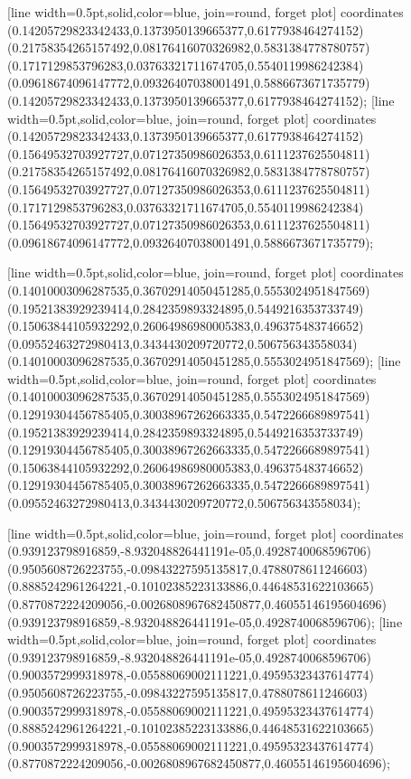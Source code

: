 [line width=0.5pt,solid,color=blue, join=round, forget plot] coordinates {(0.14205729823342433,0.1373950139665377,0.6177938464274152) (0.21758354265157492,0.08176416070326982,0.5831384778780757) (0.1717129853796283,0.03763321711674705,0.5540119986242384) (0.09618674096147772,0.09326407038001491,0.5886673671735779) (0.14205729823342433,0.1373950139665377,0.6177938464274152)};
[line width=0.5pt,solid,color=blue, join=round, forget plot] coordinates {(0.14205729823342433,0.1373950139665377,0.6177938464274152) (0.15649532703927727,0.07127350986026353,0.6111237625504811) (0.21758354265157492,0.08176416070326982,0.5831384778780757) (0.15649532703927727,0.07127350986026353,0.6111237625504811) (0.1717129853796283,0.03763321711674705,0.5540119986242384) (0.15649532703927727,0.07127350986026353,0.6111237625504811) (0.09618674096147772,0.09326407038001491,0.5886673671735779)};

[line width=0.5pt,solid,color=blue, join=round, forget plot] coordinates {(0.14010003096287535,0.36702914050451285,0.5553024951847569) (0.19521383929239414,0.2842359893324895,0.5449216353733749) (0.15063844105932292,0.26064986980005383,0.496375483746652) (0.09552463272980413,0.3434430209720772,0.506756343558034) (0.14010003096287535,0.36702914050451285,0.5553024951847569)};
[line width=0.5pt,solid,color=blue, join=round, forget plot] coordinates {(0.14010003096287535,0.36702914050451285,0.5553024951847569) (0.12919304456785405,0.30038967262663335,0.5472266689897541) (0.19521383929239414,0.2842359893324895,0.5449216353733749) (0.12919304456785405,0.30038967262663335,0.5472266689897541) (0.15063844105932292,0.26064986980005383,0.496375483746652) (0.12919304456785405,0.30038967262663335,0.5472266689897541) (0.09552463272980413,0.3434430209720772,0.506756343558034)};

[line width=0.5pt,solid,color=blue, join=round, forget plot] coordinates {(0.939123798916859,-8.932048826441191e-05,0.4928740068596706) (0.9505608726223755,-0.09843227595135817,0.4788078611246603) (0.8885242961264221,-0.10102385223133886,0.44648531622103665) (0.8770872224209056,-0.0026808967682450877,0.46055146195604696) (0.939123798916859,-8.932048826441191e-05,0.4928740068596706)};
[line width=0.5pt,solid,color=blue, join=round, forget plot] coordinates {(0.939123798916859,-8.932048826441191e-05,0.4928740068596706) (0.9003572999318978,-0.05588069002111221,0.49595323437614774) (0.9505608726223755,-0.09843227595135817,0.4788078611246603) (0.9003572999318978,-0.05588069002111221,0.49595323437614774) (0.8885242961264221,-0.10102385223133886,0.44648531622103665) (0.9003572999318978,-0.05588069002111221,0.49595323437614774) (0.8770872224209056,-0.0026808967682450877,0.46055146195604696)};

